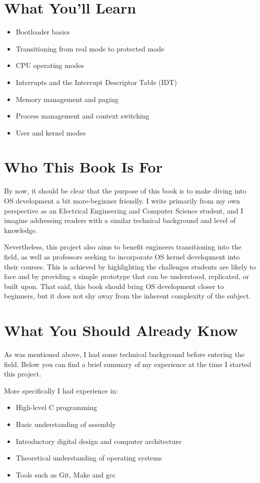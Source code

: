 \section{What You'll Learn}

\begin{itemize}
  \item Bootloader basics
  \item Transitioning from real mode to protected mode
  \item CPU operating modes
  \item Interrupts and the Interrupt Descriptor Table (IDT)
  \item Memory management and paging
  \item Process management and context switching
  \item User and kernel modes
\end{itemize}

\section{Who This Book Is For}

By now, it should be clear that the purpose of this book is to make diving into OS development a bit more-beginner friendly.
I write primarily from my own perspective as an Electrical Engineering and Computer Science student, and I imagine addressing 
readers with a similar technical background and level of knowledge.

Nevertheless, this project also aims to benefit engineers transitioning into the field, as well as professors seeking to 
incorporate OS kernel development into their courses. This is achieved by highlighting the challenges students are likely to face 
and by providing a simple prototype that can be understood, replicated, or built upon. That said, this book should bring OS 
development closer to beginners, but it does not shy away from the inherent complexity of the subject.

\section{What You Should Already Know}

As was mentioned above, I had some technical background before entering the field.
Below you can find a brief summary of my experience at the time I started this project.

More specifically I had experience in:
\begin{itemize}
    \item High-level C programming
    \item Basic understanding of assembly
    \item Introductory digital design and computer architecture
    \item Theoretical understanding of operating systems
    \item Tools such as Git, Make and gcc
  \end{itemize}

